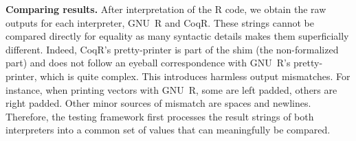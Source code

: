 \documentclass[
    sigplan,
    10pt,
    review, %
    natbib=false %
 ]{acmart}
\newcommand\CoqR{CoqR}
\begin{document}






\noindent\textbf{Comparing results.}
After interpretation of the R code, we obtain the raw outputs for each interpreter, GNU~R and \CoqR. %
These strings cannot be compared directly for equality as many syntactic details makes them superficially different. Indeed, \CoqR{}'s pretty-printer is part of the shim (the non-formalized part)
and does not follow an eyeball correspondence with GNU~R's pretty-printer, which is quite complex. This introduces harmless output mismatches. For instance, when printing vectors with GNU~R, some are left padded, others are right padded. Other minor sources of mismatch are spaces and newlines. Therefore, the testing framework first processes the result strings of both interpreters into a common set of values that can meaningfully be compared.
\end{document}
